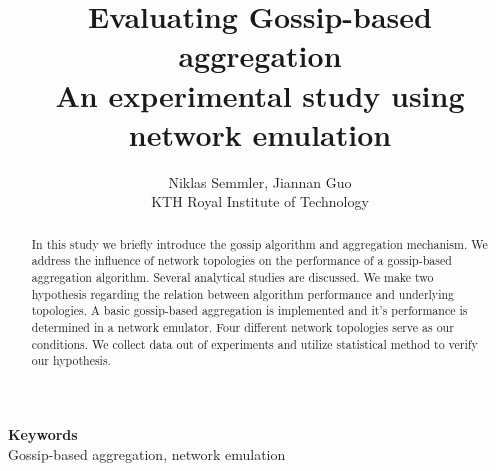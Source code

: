 \documentclass[11pt,a4paper]{article}
\date{}
\def\keywords#1{\begin{center}{\bf Keywords}\\{#1}\end{center}} %
\begin{document}
\title{Evaluating Gossip-based aggregation\\An experimental study using network emulation}

\author{
Niklas Semmler, Jiannan Guo\\
KTH Royal Institute of Technology\\
}%

\maketitle

\begin{abstract}
In this study we briefly introduce the gossip algorithm and aggregation mechanism. We address the influence of network topologies on the performance of a gossip-based aggregation algorithm. Several analytical studies are discussed. We make two hypothesis regarding the relation between algorithm performance and underlying topologies. A basic gossip-based aggregation is implemented and it's performance is determined in a network emulator. Four different network topologies serve as our conditions. We collect data out of experiments and utilize statistical method to verify our hypothesis.
\end{abstract}

\keywords{Gossip-based aggregation, network emulation}%

\newpage
\tableofcontents
\newpage








\newpage




\appendix
\end{document}
